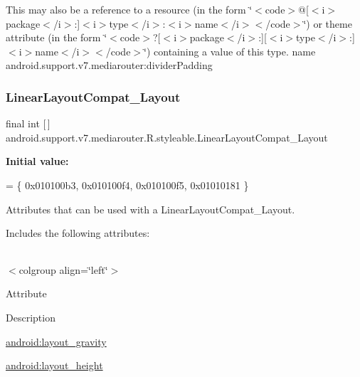 This may also be a reference to a resource (in the form \char`\"{}$<$code$>$@\mbox{[}$<$i$>$package$<$/i$>$\+:\mbox{]}$<$i$>$type$<$/i$>$\+:$<$i$>$name$<$/i$>$$<$/code$>$\char`\"{}) or theme attribute (in the form \char`\"{}$<$code$>$?\mbox{[}$<$i$>$package$<$/i$>$\+:\mbox{]}\mbox{[}$<$i$>$type$<$/i$>$\+:\mbox{]}$<$i$>$name$<$/i$>$$<$/code$>$\char`\"{}) containing a value of this type.  name android.\+support.\+v7.\+mediarouter\+:divider\+Padding \mbox{\label{classandroid_1_1support_1_1v7_1_1mediarouter_1_1R_1_1styleable_acb53f9b4011a88095f9391acfa3832fc}} 
\subsubsection{\texorpdfstring{Linear\+Layout\+Compat\+\_\+\+Layout}{LinearLayoutCompat\_Layout}}
{\footnotesize\ttfamily final int \mbox{[}$\,$\mbox{]} android.\+support.\+v7.\+mediarouter.\+R.\+styleable.\+Linear\+Layout\+Compat\+\_\+\+Layout\hspace{0.3cm}{\ttfamily [static]}}

{\bfseries Initial value\+:}
\begin{DoxyCode}
= \{
            0x010100b3, 0x010100f4, 0x010100f5, 0x01010181
        \}
\end{DoxyCode}
Attributes that can be used with a Linear\+Layout\+Compat\+\_\+\+Layout. 

Includes the following attributes\+:

\tabulinesep=1mm
\begin{longtabu} spread 0pt [c]{*{0}{|X[-1]}|}
\hline
\end{longtabu}
$<$colgroup align=\char`\"{}left\char`\"{}$>$ 

Attribute

Description 

{\ttfamily \hyperlink{classandroid_1_1support_1_1v7_1_1mediarouter_1_1R_1_1styleable_aa6fdf2458c85c1826fa468547aaf9215}{android\+:layout\+\_\+gravity}}

{\ttfamily \hyperlink{classandroid_1_1support_1_1v7_1_1mediarouter_1_1R_1_1styleable_afc7e0bb6cbbe6db8125e2377fa0da82b}{android\+:layout\+\_\+height}}

